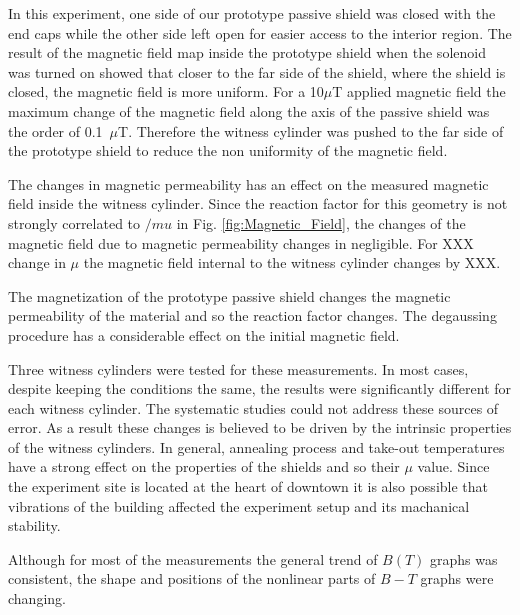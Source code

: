 In this experiment, one side of our prototype passive shield was closed with the end caps while the other side left open for easier access to the interior region. The result of the magnetic field map inside the prototype shield when the solenoid was  turned on showed that closer to the far side of the shield, where the shield is closed, the magnetic field is more uniform. For a 10$\mu$T applied magnetic field the maximum change of the magnetic field along the axis of the passive shield was the order of 0.1~$\mu$T.
Therefore the witness cylinder was pushed to the far side of the prototype shield to reduce the non uniformity of the magnetic field.

The changes in magnetic permeability has an effect on the measured magnetic field inside the witness cylinder. Since the reaction factor for this geometry is not strongly correlated to $/mu$ in Fig. \ref{fig:Magnetic_Field}, the changes of the magnetic field due to magnetic permeability changes in negligible. For XXX change in $\mu$ the magnetic field internal to the witness cylinder changes by XXX. 

The magnetization of the prototype passive shield changes the magnetic permeability of the material and so the reaction factor changes. The degaussing procedure has a considerable effect on the initial magnetic field.

Three witness cylinders were tested for these measurements. In most cases, despite keeping the conditions the same, the results were significantly different for each witness cylinder. The systematic studies could not address these sources of error. As a result these changes is believed to be driven by the intrinsic properties of the witness cylinders.   
In general, annealing process and take-out temperatures have a strong effect on the properties of the shields and so their $\mu$ value.
Since the experiment site is located at the heart of downtown it is also possible that vibrations of the building affected the experiment setup and its machanical stability.

Although for most of the measurements the general trend of $B(T)$ graphs was consistent, the shape and positions of the nonlinear parts of $B-T$ graphs were changing.




